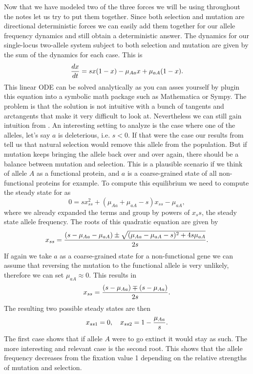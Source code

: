Now that we have modeled two of the three forces we will be using throughout
the notes let us try to put them together. Since both selection and mutation
are directional deterministic forces we can easily add them together for our
allele frequency dynamics and still obtain a deterministic answer. The dynamics
for our single-locus two-allele system subject to both selection and mutation
are given by the sum of the dynamics for each case. This is
\begin{equation}
  {d{x} \over dt} = s x (1 - x) - \mu_{Aa} x + \mu_{aA} (1 - x).
  \label{eq_sel_mut}
\end{equation}
This linear ODE can be solved analytically as you can asses yourself by plugin
this equation into a symbolic math package such as Mathematica or Sympy. The
problem is that the solution is not intuitive with a bunch of tangents and
arctangents that make it very difficult to look at. Nevertheless we can still
gain intuition from . An interesting setting to analyze is the
case where one of the alleles, let's say $a$ is deleterious, i.e. $s < 0$. If
that were the case our results from  tell us that natural
selection would remove this allele from the population. But if mutation keeps
bringing the allele back over and over again, there should be a balance between
mutation and selection. This is a plausible scenario if we think of allele $A$
as a functional protein, and $a$ is a coarse-grained state of all
non-functional proteins for example. To compute this equilibrium we need to
compute the steady state for  as
\begin{equation}
  0 = s x_{ss}^2 + (\mu_{Aa} + \mu_{aA} - s) x_{ss} - \mu_{aA},
\end{equation}
where we already expanded the terms and group by powers of $x_ss$, the steady
state allele frequency. The roots of this quadratic equation are given by
\begin{equation}
  x_{ss} = {(s - \mu_{Aa} - \mu_{aA}) \pm 
    \sqrt{(\mu_{Aa} - \mu_{aA} - s)^2 + 4 s \mu_{aA}}
    \over 2s}.
\end{equation}
If again we take $a$ as a coarse-grained state for a non-functional gene we can
assume that reversing the mutation to the functional allele is very unlikely,
therefore we can set $\mu_{aA} \approx 0$. This results in
\begin{equation}
  x_{ss} = {(s - \mu_{Aa}) \mp (s - \mu_{Aa}) \over 2s}.
\end{equation}
The resulting two possible steady states are then
\begin{equation}
  x_{ss1} = 0, \quad x_{ss2} = 1 - {\mu_{Aa} \over s}.
\end{equation}
The first case shows that if allele $A$ were to go extinct it would stay as
such. The more interesting and relevant case is the second root. This shows
that the allele frequency decreases from the fixation value 1 depending on the
relative strengths of mutation and selection.